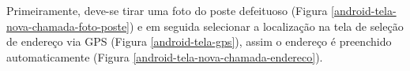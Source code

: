 \documentclass[
	article,			%
	11pt,				%
	oneside,			%
	a4paper,			%
	english,			%
	brazil,				%
	sumario=tradicional
	]{abntex2}
\begin{document}
\begin{figure}[!htbp]
\begin{minipage}{0.4\textwidth}
  \end{minipage}
\end{figure}

Primeiramente, deve-se tirar uma foto do poste defeituoso (Figura \ref{android-tela-nova-chamada-foto-poste}) e em seguida selecionar a localização na tela de seleção de endereço via GPS (Figura \ref{android-tela-gps}), assim o endereço é preenchido automaticamente (Figura \ref{android-tela-nova-chamada-endereco}).
\end{document}
